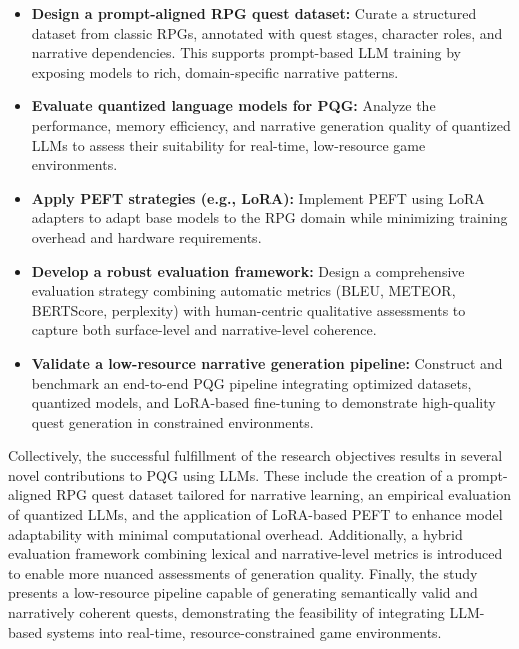 \begin{itemize}
  \item {\textbf{Design a prompt-aligned RPG quest dataset:} Curate a structured dataset
    from classic RPGs, annotated with quest stages, character roles, and narrative dependencies.
    This supports prompt-based LLM training by exposing models to rich,
    domain-specific narrative patterns.}

  \item {\textbf{Evaluate quantized language models for PQG:} Analyze the performance,
    memory efficiency, and narrative generation quality of quantized LLMs to assess
    their suitability for real-time, low-resource game environments.}

  \item {\textbf{Apply PEFT strategies (e.g., LoRA):} Implement PEFT using LoRA adapters
    to adapt base models to the RPG domain while minimizing training overhead and
    hardware requirements.}

  \item {\textbf{Develop a robust evaluation framework:} Design a comprehensive evaluation
    strategy combining automatic metrics (BLEU, METEOR, BERTScore, perplexity)
    with human-centric qualitative assessments to capture both surface-level and
    narrative-level coherence.}

  \item {\textbf{Validate a low-resource narrative generation pipeline:} Construct and benchmark
    an end-to-end PQG pipeline integrating optimized datasets, quantized models,
    and LoRA-based fine-tuning to demonstrate high-quality quest generation in constrained
    environments.}
\end{itemize}

Collectively, the successful fulfillment of the research objectives results in several novel
contributions to PQG using LLMs. These include the creation of a prompt-aligned RPG
quest dataset tailored for narrative learning, an empirical evaluation of quantized LLMs,
and the application of LoRA-based PEFT to enhance model adaptability with minimal
computational overhead. Additionally, a hybrid evaluation framework combining lexical
and narrative-level metrics is introduced to enable more nuanced assessments of generation
quality. Finally, the study presents a low-resource pipeline capable of generating
semantically valid and narratively coherent quests, demonstrating the feasibility of integrating
LLM-based systems into real-time, resource-constrained game environments.

\newpage
